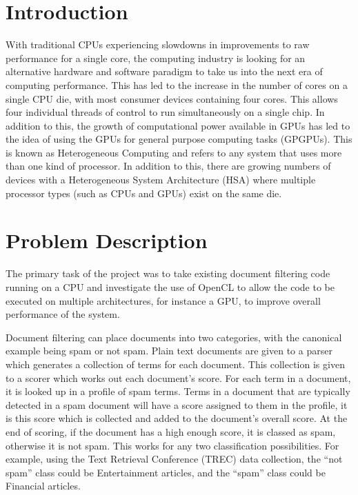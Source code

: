 \section{Introduction}

With traditional CPUs experiencing slowdowns in improvements to raw performance
for a single core, the computing industry is looking for an alternative hardware
and software paradigm to take us into the next era of computing performance.
This has led to the increase in the number of cores on a single CPU die, with
most consumer devices containing four cores. This allows four individual threads
of control to run simultaneously on a single chip. In addition to this, the
growth of computational power available in GPUs has led to the idea of using the
GPUs for general purpose computing tasks (GPGPUs). This is known as
Heterogeneous Computing and refers to any system that uses more than one kind of
processor. In addition to this, there are growing numbers of devices with a
Heterogeneous System Architecture (HSA) where multiple processor types (such as
CPUs and GPUs) exist on the same die.

\section{Problem Description}

The primary task of the project was to take existing document filtering code
running on a CPU and investigate the use of OpenCL to allow the code to be
executed on multiple architectures, for instance a GPU, to improve overall
performance of the system.

Document filtering can place documents into two categories, with the canonical
example being spam or not spam. Plain text documents are given to a parser which
generates a collection of terms for each document. This collection is given to a
scorer which works out  each document's score. For each term in a document, it
is looked up in a profile of spam terms. Terms in a document that are typically
detected in a spam document will have a score assigned to them in the profile,
it is this score which is collected and added to the document's overall score.
At the end of scoring, if the document has a high enough score, it is classed as
spam, otherwise it is not spam. This works for any two classification
possibilities. For example, using the Text Retrieval Conference (TREC) data
collection, the ``not spam'' class could be Entertainment articles, and the
``spam'' class could be Financial articles.

